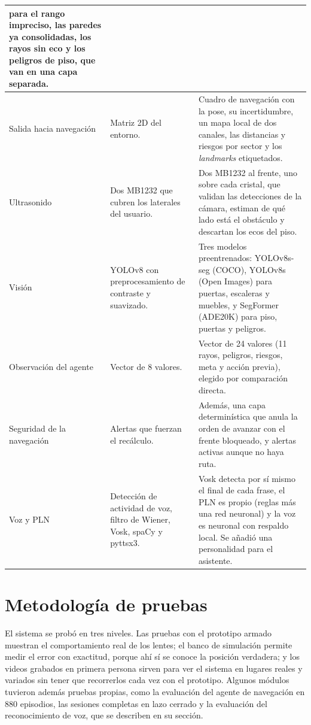\begin{longtable}{|p{3.0cm}|p{5.4cm}|p{6.1cm}|}
para el rango impreciso, las paredes ya consolidadas, los rayos sin eco y los
peligros de piso, que van en una capa separada. \\
\hline
Salida hacia navegación & Matriz 2D del entorno. & Cuadro de navegación con la pose,
su incertidumbre, un mapa local de dos canales, las distancias y riesgos por sector y
los \emph{landmarks} etiquetados. \\
\hline
Ultrasonido & Dos MB1232 que cubren los laterales del usuario. & Dos MB1232 al frente,
uno sobre cada cristal, que validan las detecciones de la cámara, estiman de qué lado
está el obstáculo y descartan los ecos del piso. \\
\hline
Visión & YOLOv8 con preprocesamiento de contraste y suavizado. & Tres modelos
preentrenados: YOLOv8s-seg (COCO), YOLOv8s (Open Images) para puertas, escaleras y
muebles, y SegFormer (ADE20K) para piso, puertas y peligros. \\
\hline
Observación del agente & Vector de 8 valores. & Vector de 24 valores (11 rayos,
peligros, riesgos, meta y acción previa), elegido por comparación directa. \\
\hline
Seguridad de la navegación & Alertas que fuerzan el recálculo. & Además, una capa
determinística que anula la orden de avanzar con el frente bloqueado, y alertas
activas aunque no haya ruta. \\
\hline
Voz y PLN & Detección de actividad de voz, filtro de Wiener, Vosk, spaCy y pyttsx3. &
Vosk detecta por sí mismo el final de cada frase, el PLN es propio (reglas más una red
neuronal) y la voz es neuronal con respaldo local. Se añadió una personalidad para el
asistente. \\
\hline
\end{longtable}

\section{Metodología de pruebas}
\label{sec:validacion_representacion}

El sistema se probó en tres niveles. Las pruebas con el prototipo armado muestran el
comportamiento real de los lentes; el banco de simulación permite medir el error con
exactitud, porque ahí sí se conoce la posición verdadera; y los videos grabados en
primera persona sirven para ver el sistema en lugares reales y variados sin tener que
recorrerlos cada vez con el prototipo. Algunos módulos tuvieron además pruebas
propias, como la evaluación del agente de navegación en 880 episodios, las sesiones
completas en lazo cerrado y la evaluación del reconocimiento de voz, que se describen
en su sección.

